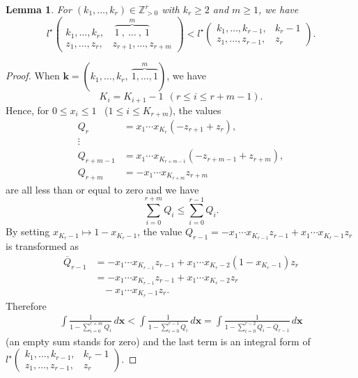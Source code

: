 \documentclass[12pt,a4paper]{article}
\newtheorem{lemma}[defi]{Lemma}
\theoremstyle{remark}
\begin{document}
\begin{lemma}\label{lemma:1^m_inequality}
For $(k_1,\ldots, k_r) \in \mathbb{Z}_{>0}^r$ with $k_r\ge 2$
and $m\ge 1$, we have
\[ l^{\star}
\begin{pmatrix}
k_1, \ldots , k_r,& \  \overbrace{1\ ,\  \ldots \  ,\ 1}^m \\
z_1, \ldots , z_r,& z_{r+1}, \ldots ,z_{r+m}
\end{pmatrix}
< l^{\star}\begin{pmatrix}
k_1, \ldots , k_{r-1},& k_r-1 \\
z_1, \ldots , z_{r-1},& z_r
\end{pmatrix}.
\]

\end{lemma}
\begin{proof}

When
$\boldsymbol{k}
=(k_1, \ldots , k_r, \  \overbrace{1, \ldots , 1}^m)$,
we have 
\[K_i=K_{i+1}-1\ \ (r\le i \le r+m-1).\]
Hence, 
for $0\le x_i \le 1$ \  ($1\le i \le K_{r+m}$),
the values
\begin{align*}
 Q_r&= x_1\cdots x_{K_r}(-z_{r+1}+z_r),\\
\vdots \\
 Q_{r+m-1}&= x_1\cdots x_{K_{r+m-1}}(-z_{r+m-1}+z_{r+m}),\\
 Q_{r+m}&= -x_1\cdots x_{K_{r+m}}z_{r+m}
\end{align*}
are all less than or equal to zero
and we have
\[ \sum_{i=0}^{r+m} Q_i \le \sum_{i=0}^{r-1} Q_i.  \]
By setting $x_{K_r-1} \mapsto 1-x_{K_r-1}$,
the value
$Q_{r-1} = -x_1\cdots x_{K_{r-1}}z_{r-1}
+x_1\cdots x_{K_r-1}z_r
$
is transformed as 
\begin{align*}
\overline{Q}_{r-1}&= -x_1\cdots x_{K_{r-1}}z_{r-1}
+x_1\cdots x_{K_r-2}(1-x_{K_r-1})z_r \\
&= -x_1\cdots x_{K_{r-1}}z_{r-1}
+x_1\cdots x_{K_r-2}z_r\\
&\ \ \ \ - x_1\cdots x_{K_r-1}z_r.
\end{align*}
Therefore 
\begin{align*}
\displaystyle\int \frac{1}{1-\sum_{i=0}^{r+m} Q_i}\,
d\boldsymbol{x}
<
\int \frac{1}{1-\sum_{i=0}^{r-1} Q_i}\,
d\boldsymbol{x}
=
\int \frac{1}{1-\sum_{i=0}^{r-2} Q_i - \overline{Q}_{r-1}}\,
d\boldsymbol{x}
\end{align*}
(an empty sum stands for zero)
and the last term is an integral form of
$l^{\star}\begin{pmatrix}
k_1, \ldots , k_{r-1},& k_r-1 \\
z_1, \ldots , z_{r-1},& z_r
\end{pmatrix}$.
\end{proof}
\end{document}

